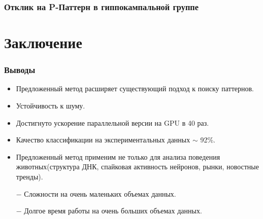 \documentclass[smaller]{beamer}
\begin{document}
\begin{frame}
  \frametitle{Отклик на P-Паттерн в гиппокампальной группе}
\begin{figure}[h]
\noindent{}
\end{figure}
\end{frame}


\section{Заключение}



\begin{frame}
  \frametitle{Выводы}
  \begin{itemize}
   \item Предложенный метод расширяет существующий подход
	  к поиску паттернов.
   \item Устойчивость к шуму.
   \item Достигнуто ускорение параллельной версии на GPU в 40 раз.
   \item Качество классификации на экспериментальных данных $\sim$ 92\%.
   \item Предложенный метод применим не только для анализа поведения животных(структура ДНК, спайковая активность нейронов, рынки, новостные тренды).

\item[$-$] Сложности на очень маленьких объемах данных.
\item[$-$] Долгое время работы на очень больших объемах данных.
  \end{itemize}
\end{frame}
\end{document}
